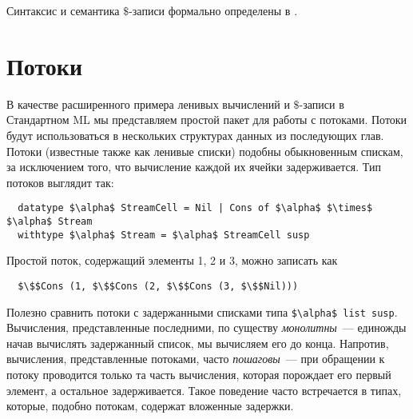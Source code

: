 Синтаксис и семантика $\$$-записи формально определены в
\cite{Okasaki1996a}.

\section{Потоки}
\label{sc:4.2}

В качестве расширенного примера ленивых вычислений и $\$$-записи в
Стандартном ML мы представляем простой пакет для работы с
потоками. Потоки будут использоваться в нескольких структурах данных
из последующих глав.
Потоки (известные также как ленивые списки) подобны обыкновенным
спискам, за исключением того, что вычисление каждой их ячейки задерживается. Тип
потоков выглядит так:
\begin{lstlisting}
  datatype $\alpha$ StreamCell = Nil | Cons of $\alpha$ $\times$ $\alpha$ Stream
  withtype $\alpha$ Stream = $\alpha$ StreamCell susp
\end{lstlisting}
Простой поток, содержащий элементы 1, 2 и 3, можно записать как
\begin{lstlisting}
  $\$$Cons (1, $\$$Cons (2, $\$$Cons (3, $\$$Nil)))
\end{lstlisting}

Полезно сравнить потоки с задержанными списками типа
\lstinline!$\alpha$ list susp!. Вычисления, представленные последними,
по существу {\em монолитны}~--- единожды начав вычислять задержанный
список, мы вычисляем его до конца. Напротив, вычисления,
представленные потоками, часто {\em пошаговы}~--- при обращении к
потоку проводится только та часть вычисления, которая порождает его
первый элемент, а остальное задерживается. Такое поведение часто
встречается в типах, которые, подобно потокам, содержат вложенные
задержки.

